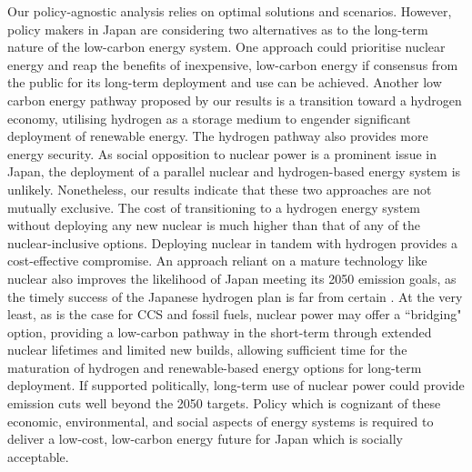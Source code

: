 Our policy-agnostic analysis relies on optimal solutions and scenarios. However, policy makers in Japan are considering two alternatives as to the long-term nature of the low-carbon energy system. One approach could prioritise nuclear energy and reap the benefits of inexpensive, low-carbon energy if consensus from the public for its long-term deployment and use can be achieved. Another low carbon energy pathway proposed by our results is a transition toward a hydrogen economy, utilising hydrogen as a storage medium to engender significant deployment of renewable energy. The hydrogen pathway also provides more energy security. As social opposition to nuclear power is a prominent issue in Japan, the deployment of a parallel nuclear and hydrogen-based energy system is unlikely. Nonetheless, our results indicate that these two approaches are not mutually exclusive. The cost of transitioning to a hydrogen energy system without deploying any new nuclear is much higher than that of any of the nuclear-inclusive options. Deploying nuclear in tandem with hydrogen provides a cost-effective compromise. An approach reliant on a mature technology like nuclear also improves the likelihood of Japan meeting its 2050 emission goals, as the timely success of the Japanese hydrogen plan is far from certain \DIFaddbegin {}\DIFaddend . At the very least, as is the case for CCS and fossil fuels, nuclear power may offer a ``bridging" option, providing a low-carbon pathway in the short-term through extended nuclear lifetimes and limited new builds, allowing sufficient time for the maturation of hydrogen and renewable-based energy options for long-term deployment. If supported politically, long-term use of nuclear power could provide emission cuts well beyond the 2050 targets. Policy which is cognizant of these economic, environmental, and social aspects of energy systems is required to deliver a low-cost, low-carbon energy future for Japan which is socially acceptable.